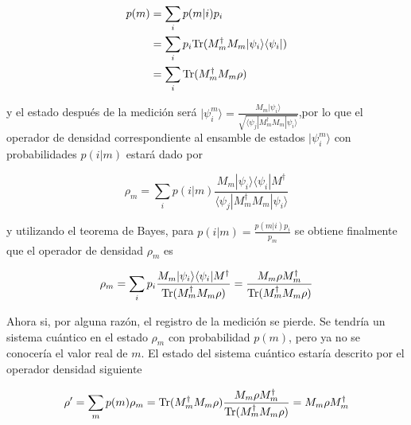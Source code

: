 
\begin{equation}
	\label{probabilidad_m}
	\begin{split}
	p(m) &= \sum_{i}p(m|i)p_i\\
	&=\sum_i p_i{\rm Tr}(M_m^{\dagger} M_m |\psi_i\rangle \langle\psi_i|)\\
	&=\sum_{i}{\rm Tr}(M_m^{\dagger} M_m \rho)
	\end{split}
\end{equation}
	


y el estado después de la medición será $|\psi_i^m\rangle=\frac{M_m|\psi_i\rangle}{\sqrt{\langle\psi_j|M_m^{\dagger}M_m|\psi_i\rangle}}$,por lo que el operador de densidad correspondiente al ensamble de estados $|\psi_i^m\rangle$ con probabilidades $p(i|m)$ estará dado por

\[\rho_m=\sum_i p(i|m)\frac{M_m|\psi_i\rangle \langle \psi_i|M^{\dagger}}{\langle\psi_j|M_m^{\dagger}M_m|\psi_i\rangle}\]

y  utilizando el teorema de Bayes, para $p(i|m)=\frac{p(m|i)p_i}{p_m}$ se obtiene finalmente que el operador de densidad $\rho_m$ es{\cite{nielsen_chuang_2010}}

\begin{equation}
	\rho_m=\sum_i p_i \dfrac{M_m|\psi_i\rangle \langle \psi_i|M^{\dagger}}{{\rm Tr}(M^{\dagger}_m M_m \rho )}=\dfrac{M_m \rho M_m^{\dagger}}{{\rm Tr} (M^{\dagger}_m M_m\rho )}
\end{equation}


Ahora si, por alguna razón, el registro de la medición se pierde. Se tendría un sistema cuántico en el estado $\rho_m$ con probabilidad $p(m)$, pero ya no se conocería el valor real de $m$. El estado del sistema cuántico estaría descrito por el operador densidad siguiente

\begin{equation}
	\rho'=\sum_m p(m)\rho_m={\rm Tr}(M^{\dagger}_m M_m\rho )\dfrac{M_m\rho M_m^{\dagger}}{{\rm Tr} (M^{\dagger}_m M_m \rho )}=M_m\rho M_m^{\dagger}
\end{equation}


